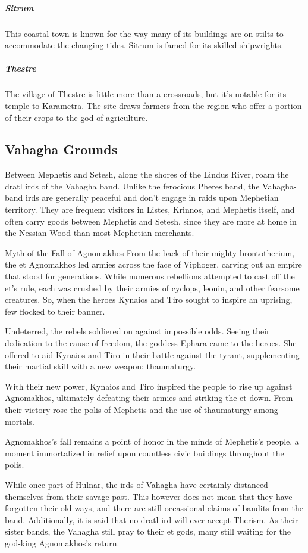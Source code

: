         \subparagraph{Sitrum} This coastal town is known for the way many of its buildings are on stilts to accommodate the changing tides.
        Sitrum is famed for its skilled shipwrights.

        \subparagraph{Thestre} The village of Thestre is little more than a crossroads, but it's notable for its temple to Karametra.
        The site draws farmers from the region who offer a portion of their crops to the god of agriculture.

\subsection*{Vahagha Grounds}
    Between Mephetis and Setesh, along the shores of the Lindus River, roam the dratl irds of the Vahagha band.
    Unlike the ferocious Pheres band, the Vahagha-band irds are generally peaceful and don't engage in raids upon Mephetian territory.
    They are frequent visitors in Listes, Krinnos, and Mephetis itself, and often carry goods between Mephetis and Setesh, since they are more at home in the Nessian Wood than most Mephetian merchants.

    \begin{DndComment}[float=t]{Myth of the Fall of Agnomakhos}
        From the back of their mighty brontotherium, the et Agnomakhos led armies across the face of Viphoger, carving out an empire that stood for generations.
        While numerous rebellions attempted to cast off the et's rule, each was crushed by their armies of cyclops, leonin, and other fearsome creatures.
        So, when the heroes Kynaios and Tiro sought to inspire an uprising, few flocked to their banner.

        Undeterred, the rebels soldiered on against impossible odds.
        Seeing their dedication to the cause of freedom, the goddess Ephara came to the heroes.
        She offered to aid Kynaios and Tiro in their battle against the tyrant, supplementing their martial skill with a new weapon: thaumaturgy.

        With their new power, Kynaios and Tiro inspired the people to rise up against Agnomakhos, ultimately defeating their armies and striking the et down.
        From their victory rose the polis of Mephetis and the use of thaumaturgy among mortals.

        Agnomakhos's fall remains a point of honor in the minds of Mephetis's people, a moment immortalized in relief upon countless civic buildings throughout the polis.
    \end{DndComment}

    While once part of Hulnar, the irds of Vahagha have certainly distanced themselves from their savage past.
    This however does not mean that they have forgotten their old ways, and there are still occassional claims of bandits from the band.
    Additionally, it is said that no dratl ird will ever accept Therism.
    As their sister bands, the Vahagha still pray to their et gods, many still waiting for the god-king Agnomakhos's return.

\pagebreak
